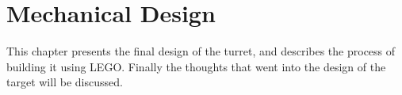 \chapter{Mechanical Design}\label{MechDesign}
This chapter presents the final design of the turret, and describes the process
of building it using LEGO.
Finally the thoughts that went into the design of the target will be discussed.





